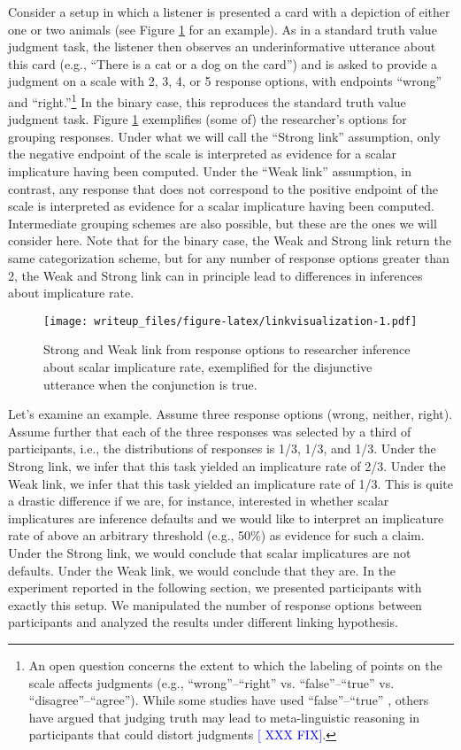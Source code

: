 \documentclass[man]{apa6}
\newcommand{\change}[1]{\textcolor{Blue}{[#1]}}
\theoremstyle{definition}
\theoremstyle{definition}
\theoremstyle{definition}
\theoremstyle{remark}
\begin{document}
Consider a setup in which a listener is presented a card with a
depiction of either one or two animals (see Figure
\ref{fig:linkvisualization} for an example). As in a standard truth
value judgment task, the listener then observes an underinformative
utterance about this card (e.g., \enquote{There is a cat or a dog on the
card}) and is asked to provide a judgment on a scale with 2, 3, 4, or 5
response options, with endpoints \enquote{wrong} and
\enquote{right.}\footnote{An open question concerns the extent to which
  the labeling of points on the scale affects judgments (e.g.,
  \enquote{wrong}--\enquote{right} vs. \enquote{false}--\enquote{true}
  vs. \enquote{disagree}--\enquote{agree}). While some studies have used
  \enquote{false}--\enquote{true} \cite{bott2004, doran2012}, others have argued that judging truth
  may lead to meta-linguistic reasoning in participants that could
  distort judgments \change{\cite{XXX} XXX FIX}.} In the binary case, this reproduces the standard
truth value judgment task. Figure \ref{fig:linkvisualization}
exemplifies (some of) the researcher's options for grouping responses.
Under what we will call the \enquote{Strong link} assumption, only the
negative endpoint of the scale is interpreted as evidence for a scalar
implicature having been computed. Under the \enquote{Weak link}
assumption, in contrast, any response that does not correspond to the
positive endpoint of the scale is interpreted as evidence for a scalar
implicature having been computed. Intermediate grouping schemes are also
possible, but these are the ones we will consider here. Note that for
the binary case, the Weak and Strong link return the same categorization
scheme, but for any number of response options greater than 2, the Weak
and Strong link can in principle lead to differences in inferences about
implicature rate.

\begin{figure}
\centering
\texttt{[image: writeup\_files/figure-latex/linkvisualization-1.pdf]}
\caption{\label{fig:linkvisualization}Strong and Weak link from response
options to researcher inference about scalar implicature rate,
exemplified for the disjunctive utterance when the conjunction is true.}
\end{figure}

Let's examine an example. Assume three response options (wrong, neither,
right). Assume further that each of the three responses was selected by
a third of participants, i.e., the distributions of responses is 1/3,
1/3, and 1/3. Under the Strong link, we infer that this task yielded an
implicature rate of 2/3. Under the Weak link, we infer that this task
yielded an implicature rate of 1/3. This is quite a drastic difference
if we are, for instance, interested in whether scalar implicatures are
inference defaults and we would like to interpret an implicature rate of
above an arbitrary threshold (e.g., 50\%) as evidence for such a claim.
Under the Strong link, we would conclude that scalar implicatures are
not defaults. Under the Weak link, we would conclude that they are. In
the experiment reported in the following section, we presented
participants with exactly this setup. We manipulated the number of
response options between participants and analyzed the results under
different linking hypothesis.
\end{document}
